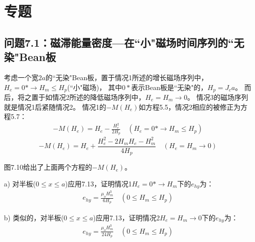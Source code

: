 \section{专题}
\subsection{问题7.1：磁滞能量密度---在``小"磁场时间序列的``无染"Bean板}
考虑一个宽$2a$的``无染"Bean板，置于情况1所述的增长磁场序列中，$H_e=0*\rightarrow H_m\le H_p$(``小"磁场)，
其中$0*$表示Bean板是``无染"的，$H_p=J_c a$。
而后，将之置于如情况2所述的降低磁场序列中，$H_e=H_m\rightarrow 0$。
情况3的磁场序列就是情况1后紧随情况2。
情况1的$-M(H_e)$如方程5.5，情况2相应的被修正为方程5.7：
\begin{align*}%
-M(H_e)=H_e-\frac{H_{e}^{2}}{2H_p} \quad (H_e=0*\rightarrow H_m\leq H_p) \tag{5.5}
\end{align*}
\begin{equation}%
-M(H_e)=H_e+\frac{H_{e}^{2}-2H_mH_e-H_{m}^{2}}{4H_p}   \quad   (H_e=H_m\rightarrow 0)
\end{equation}

图7.10给出了上面两个方程的$-M(H_e)$。

a) 对半板($0\le x\le a$)应用7.13，证明情况1$H_e=0*\rightarrow H_m$下的$e_{hy}$为：
\begin{align*}%
e_{hy}=\frac{\mu_oH_{m}^{3}}{6H_p}  \quad      (0\leq H_m\leq H_p) \tag{7.13b}
\end{align*}

b) 类似的，对半板($0\le x\le a$)应用7.13，证明情况2$H_e=H_m\rightarrow 0$下的$e_{hy}$为：
\begin{align}%
e_{hy}=\frac{\mu_oH_{m}^{3}}{24H_p}  \quad     (0\leq H_m\leq H_p)
\end{align}

